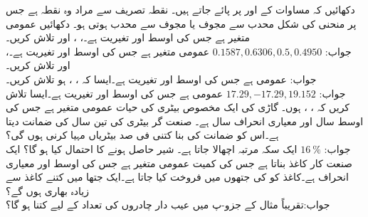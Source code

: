 \quad
دکھائیں کہ مساوات  کے  اور  پر پائے جاتے ہیں۔ نقطہ تصریف سے مراد وہ نقطہ ہے جس پر منحنی کی شکل محدب سے مجوف یا مجوف سے محدب ہوتی ہو۔
\quad
دکھائیں 
\quad
{} عمومی متغیر ہے جس کی اوسط  اور تغیریت  ہے۔، ،  اور  تلاش کریں۔\\
جواب:\quad
$0.1587,0.6306,0.5,0.4950$
\quad
{} عمومی متغیر ہے جس کی اوسط  اور تغیریت  ہے۔،  اور  تلاش کریں۔\\
جواب:\quad
{}
\quad
{} عمومی ہے جس کی اوسط  اور تغیریت  ہے۔ایسا   کہ ، ،  ہو تلاش کریں۔\\
جواب:\quad
$17.29,-17.29,19.152$
\quad
{} عمومی ہے جس کی اوسط  اور تغیریت  ہے۔ایسا  تلاش کریں کہ ،
 ،  ہوں۔
\quad
گاڑی کی ایک مخصوص بیٹری کی حیات   عمومی متغیر ہے جس کی اوسط  سال اور معیاری انحراف  سال ہے۔ صنعت گر بیٹری کی تین سال کی ضمانت دیتا ہے۔اس کو ضمانت کی بنا کتنی فی صد بیٹریاں مہیا کرنی ہوں گی؟\\
جواب:\quad
$\SI{16}{\percent}$
\quad
ایک سکہ  مرتبہ اچھالا جاتا ہے۔ شیر حاصل ہونے کا احتمال کیا ہو گا؟
\quad
ایک صنعت کار کاغذ بناتا ہے جس کی کمیت عمومی متغیر ہے جس کی اوسط  اور معیاری انحراف  ہے۔کاغذ کو  کی جتھوں میں فروخت کیا جاتا ہے۔ایک جتھا میں کتنے کاغذ  سے زیادہ بھاری ہوں گے؟\\
جواب:\quad تقریباً 
\quad
مثال  کے جزو-پ میں عیب دار چادروں کی تعداد  کے لیے  کتنا ہو گا؟ 
